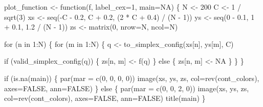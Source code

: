 \documentclass[
  letterpaper,
  DIV=11,
  numbers=noendperiod]{scrartcl}
\newenvironment{Shaded}{\begin{snugshade}}{\end{snugshade}}
\newcommand{\AttributeTok}[1]{\textcolor[rgb]{0.40,0.45,0.13}{#1}}
\newcommand{\ConstantTok}[1]{\textcolor[rgb]{0.56,0.35,0.01}{#1}}
\newcommand{\ControlFlowTok}[1]{\textcolor[rgb]{0.00,0.23,0.31}{#1}}
\newcommand{\DecValTok}[1]{\textcolor[rgb]{0.68,0.00,0.00}{#1}}
\newcommand{\FloatTok}[1]{\textcolor[rgb]{0.68,0.00,0.00}{#1}}
\newcommand{\FunctionTok}[1]{\textcolor[rgb]{0.28,0.35,0.67}{#1}}
\newcommand{\NormalTok}[1]{\textcolor[rgb]{0.00,0.23,0.31}{#1}}
\newcommand{\OtherTok}[1]{\textcolor[rgb]{0.00,0.23,0.31}{#1}}
\newcommand{\SpecialCharTok}[1]{\textcolor[rgb]{0.37,0.37,0.37}{#1}}
\begin{document}
\begin{Shaded}
\begin{Highlighting}[]
\NormalTok{plot\_function }\OtherTok{\textless{}{-}} \ControlFlowTok{function}\NormalTok{(f, }\AttributeTok{label\_cex=}\DecValTok{1}\NormalTok{, }\AttributeTok{main=}\ConstantTok{NA}\NormalTok{) \{}
\NormalTok{  N }\OtherTok{\textless{}{-}} \DecValTok{200}
\NormalTok{  C }\OtherTok{\textless{}{-}} \DecValTok{1} \SpecialCharTok{/} \FunctionTok{sqrt}\NormalTok{(}\DecValTok{3}\NormalTok{)}
\NormalTok{  xs }\OtherTok{\textless{}{-}} \FunctionTok{seq}\NormalTok{(}\SpecialCharTok{{-}}\NormalTok{C }\SpecialCharTok{{-}} \FloatTok{0.2}\NormalTok{, C }\SpecialCharTok{+} \FloatTok{0.2}\NormalTok{, (}\DecValTok{2} \SpecialCharTok{*}\NormalTok{ C }\SpecialCharTok{+} \FloatTok{0.4}\NormalTok{) }\SpecialCharTok{/}\NormalTok{ (N }\SpecialCharTok{{-}} \DecValTok{1}\NormalTok{))}
\NormalTok{  ys }\OtherTok{\textless{}{-}} \FunctionTok{seq}\NormalTok{(}\DecValTok{0} \SpecialCharTok{{-}} \FloatTok{0.1}\NormalTok{, }\DecValTok{1} \SpecialCharTok{+} \FloatTok{0.1}\NormalTok{, }\FloatTok{1.2} \SpecialCharTok{/}\NormalTok{ (N }\SpecialCharTok{{-}} \DecValTok{1}\NormalTok{))}
\NormalTok{  zs }\OtherTok{\textless{}{-}} \FunctionTok{matrix}\NormalTok{(}\DecValTok{0}\NormalTok{, }\AttributeTok{nrow=}\NormalTok{N, }\AttributeTok{ncol=}\NormalTok{N)}

  \ControlFlowTok{for}\NormalTok{ (n }\ControlFlowTok{in} \DecValTok{1}\SpecialCharTok{:}\NormalTok{N) \{}
    \ControlFlowTok{for}\NormalTok{ (m }\ControlFlowTok{in} \DecValTok{1}\SpecialCharTok{:}\NormalTok{N) \{}
\NormalTok{      q }\OtherTok{\textless{}{-}} \FunctionTok{to\_simplex\_config}\NormalTok{(xs[n], ys[m], C)}

      \ControlFlowTok{if}\NormalTok{ (}\FunctionTok{valid\_simplex\_config}\NormalTok{(q)) \{}
\NormalTok{        zs[n, m] }\OtherTok{\textless{}{-}} \FunctionTok{f}\NormalTok{(q)}
\NormalTok{      \} }\ControlFlowTok{else}\NormalTok{ \{}
\NormalTok{        zs[n, m] }\OtherTok{\textless{}{-}} \ConstantTok{NA}
\NormalTok{      \}}
\NormalTok{    \}}
\NormalTok{  \}}

  \ControlFlowTok{if}\NormalTok{ (}\FunctionTok{is.na}\NormalTok{(main)) \{}
    \FunctionTok{par}\NormalTok{(}\AttributeTok{mar =} \FunctionTok{c}\NormalTok{(}\DecValTok{0}\NormalTok{, }\DecValTok{0}\NormalTok{, }\DecValTok{0}\NormalTok{, }\DecValTok{0}\NormalTok{))}
    \FunctionTok{image}\NormalTok{(xs, ys, zs, }\AttributeTok{col=}\FunctionTok{rev}\NormalTok{(cont\_colors), }\AttributeTok{axes=}\ConstantTok{FALSE}\NormalTok{, }\AttributeTok{ann=}\ConstantTok{FALSE}\NormalTok{)}
\NormalTok{  \} }\ControlFlowTok{else}\NormalTok{ \{}
    \FunctionTok{par}\NormalTok{(}\AttributeTok{mar =} \FunctionTok{c}\NormalTok{(}\DecValTok{0}\NormalTok{, }\DecValTok{0}\NormalTok{, }\DecValTok{2}\NormalTok{, }\DecValTok{0}\NormalTok{))}
    \FunctionTok{image}\NormalTok{(xs, ys, zs, }\AttributeTok{col=}\FunctionTok{rev}\NormalTok{(cont\_colors), }\AttributeTok{axes=}\ConstantTok{FALSE}\NormalTok{, }\AttributeTok{ann=}\ConstantTok{FALSE}\NormalTok{)}
    \FunctionTok{title}\NormalTok{(main)}
\NormalTok{  \}}


\end{Highlighting}
\end{Shaded}
\end{document}
